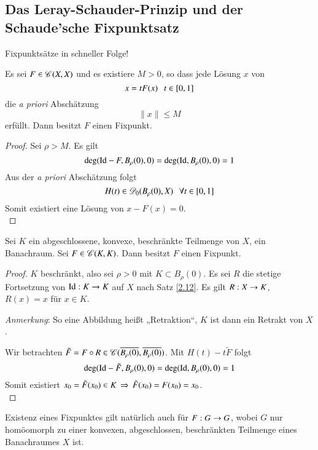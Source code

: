 \subsection{Das Leray-Schauder-Prinzip und der Schaude'sche Fixpunktsatz}

Fixpunktsätze in schneller Folge!

\begin{theorem}\label{3.12}
    Es sei $F\in \mathscr C(X,X)$ und es existiere $M>0$, so dass jede Lösung $x$ von
    \[
        x=tF(x) \hspace{.25cm} t\in [0,1]
    \]
    die \textit{a priori} Abschätzung
    \[
        \|x\|\leq M
    \]
    erfüllt. Dann besitzt $F$ einen Fixpunkt.
\end{theorem}

\begin{proof}
    Sei $\rho>M$. Es gilt
    \[
        \deg(\mathrm{Id}-F,B_\rho(0),0)=\deg(\mathrm{Id},B_\rho(0),0)=1
    \]
    Aus der \textit{a priori} Abschätzung folgt
    \[
        H(t)\in \mathscr D_0(B_\rho(0),X) \hspace{.25cm} \forall t\in [0,1]
    \]
    Somit existiert eine Lösung von $x-F(x)=0$.
    \[ \]
\end{proof}

\begin{theorem}\label{3.13}
    Sei $K$ ein abgeschlossene, konvexe, beschränkte Teilmenge von $X$, ein Banachraum. Sei
    $F\in \mathscr C(K,K)$. Dann besitzt $F$ einen Fixpunkt.
\end{theorem}

\begin{proof}
    $K$ beschränkt, also sei $\rho>0$ mit $K\subset B_\rho(0)$. Es sei $R$ die stetige Fortsetzung von
    $\mathrm{Id}:K\rightarrow K$ auf $X$ nach Satz \ref{2.12}. Es gilt $R:X\rightarrow K$, $R(x)=x$ für $x\in K$.

    \noindent\textit{Anmerkung}: So eine Abbildung heißt „Retraktion“, $K$ ist dann ein Retrakt von $X$.

    \noindent Wir betrachten $\tilde F=F\circ R\in \mathscr C(\overline{B_\rho(0)},\overline{B_\rho(0)})$. Mit $H(t)
    -t\tilde F$ folgt
    \[
        \deg(\mathrm{Id}-\tilde F, B_\rho(0),0)=\deg(\mathrm{Id},B_\rho(0),0)=1
    \]
    Somit existiert $x_0=\tilde F(x_0)\in K \, \Rightarrow \, \tilde F(x_0)=F(x_0)=x_0$. 
    \[ \]
\end{proof}

\begin{remark}
    Existenz eines Fixpunktes gilt natürlich auch für $F:G\rightarrow G$, wobei $G$ nur homöomorph zu einer
    konvexen, abgeschlossen, beschränkten Teilmenge eines Banachraumes $X$ ist.
\end{remark}

